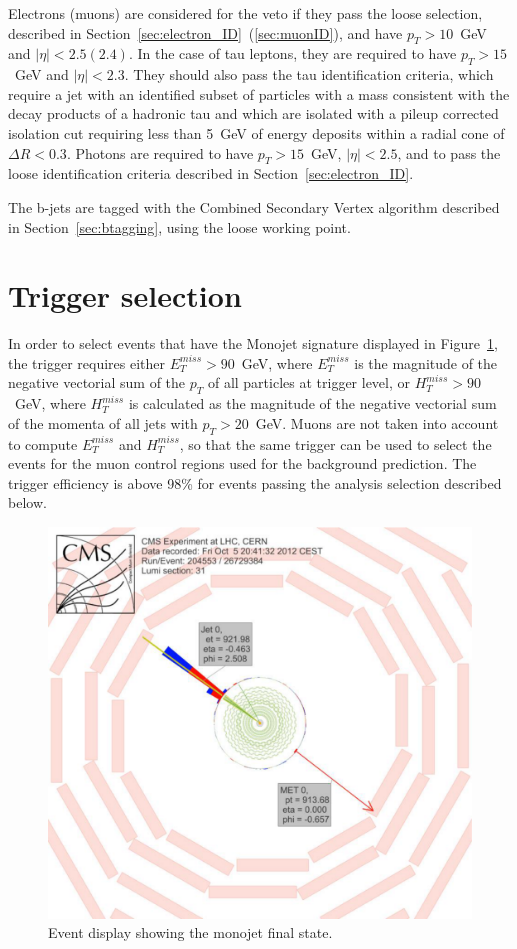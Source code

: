 Electrons (muons) are considered for the veto if they pass the loose selection, described in Section~\ref{sec:electron_ID}~(\ref{sec:muonID}), and have $p_T > 10$~GeV and $|\eta| < 2.5 (2.4)$. In the case of tau leptons, they are required to have $p_T > 15$~GeV and $|\eta| < 2.3$. They should also pass the tau identification criteria, which require a jet with an identified subset of particles with a mass consistent with the decay products of a hadronic tau and which are isolated with a pileup corrected isolation cut requiring less than 5~GeV of energy deposits within a radial cone of $\Delta R < 0.3$. Photons are required to have $p_T > 15$~GeV, $|\eta| < 2.5$, and to pass the loose identification criteria described in Section~\ref{sec:electron_ID}. 

The b-jets are tagged with the Combined Secondary Vertex algorithm described in Section~\ref{sec:btagging}, using the loose working point.

\section{Trigger selection}

In order to select events that have the Monojet signature displayed in Figure~\ref{fig:monojet_display}, the trigger requires either $E_T^{miss} > 90$~GeV, where $E_T^{miss}$ is the magnitude of the negative vectorial sum of the $p_T$ of all particles at trigger level, or $H_T^ {miss} > 90$ ~GeV, where $H_T^{miss}$ is calculated as the magnitude of the negative vectorial sum of the momenta of all jets with $p_T > 20$~GeV. Muons are not taken into account to compute $E_T^{miss}$ and $H_T^{miss}$, so that the same trigger can be used to select the events for the muon control regions used for the background prediction. The trigger efficiency is above 98\% for events passing the analysis selection described below.

\begin{figure}[ht]
  \centering
 \includegraphics[width=.6\textwidth]{monojet_event.pdf} 
 \caption{Event display showing the monojet final state.}
 \label{fig:monojet_display}
\end{figure}



